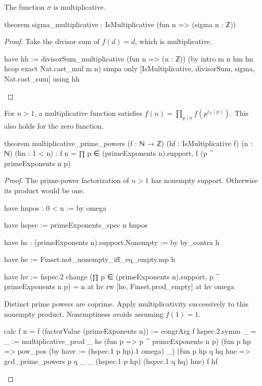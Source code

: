 \begin{theorem}
  \label{ent:thm:sigma-multiplicative}
  The function $\sigma$ is multiplicative.

  \begin{lean}
    theorem sigma_multiplicative : IsMultiplicative (fun n => (sigma n : ℤ))
  \end{lean}
\end{theorem}

\begin{proof}
  Take the divisor sum of $f(d)=d$, which is multiplicative.

  \begin{lean}
    have hh := divisorSum_multiplicative (fun n => (n : ℤ)) (by
      intro m n hm hn hcop
      exact Nat.cast_mul m n)
    simpa only [IsMultiplicative, divisorSum, sigma, Nat.cast_sum] using hh
  \end{lean}
\end{proof}

\begin{theorem}
  \label{ent:thm:multiplicative-prime-powers}
  For $n>1$, a multiplicative function satisfies $f(n)=\prod_{p\mid n}f(p^{e_n(p)})$.
  This also holds for the zero function.

  \begin{lean}
    theorem multiplicative_prime_powers (f : ℕ → ℤ) (hf : IsMultiplicative f)
        (n : ℕ) (hn : 1 < n) :
        f n = ∏ p ∈ (primeExponents n).support, f (p ^ primeExponents n p)
  \end{lean}
\end{theorem}

\begin{proof}
  The prime-power factorization of $n>1$ has nonempty support.
  Otherwise its product would be one.

  \begin{lean}
    have hnpos : 0 < n := by
      omega

    have hspec := primeExponents_spec n hnpos

    have hs : (primeExponents n).support.Nonempty := by
      by_contra h

      have he := Finset.not_nonempty_iff_eq_empty.mp h

      have hv := hspec.2
      change (∏ p ∈ (primeExponents n).support, p ^ primeExponents n p) = n at hv
      rw [he, Finset.prod_empty] at hv
      omega
  \end{lean}

  Distinct prime powers are coprime.
  Apply multiplicativity successively to this nonempty product.
  Nonemptiness avoids assuming $f(1)=1$.

  \begin{lean}
    calc
      f n = f (factorValue (primeExponents n)) := congrArg f hspec.2.symm
      _ = _ := multiplicative_prod _ hs (fun p => p ^ primeExponents n p)
        (fun p hp => pow_pos (by
            have := (hspec.1 p hp).1
            omega) _)
        (fun p hp q hq hne => gcd_prime_powers p q _ _ (hspec.1 p hp) (hspec.1 q hq) hne) f hf
  \end{lean}
\end{proof}

